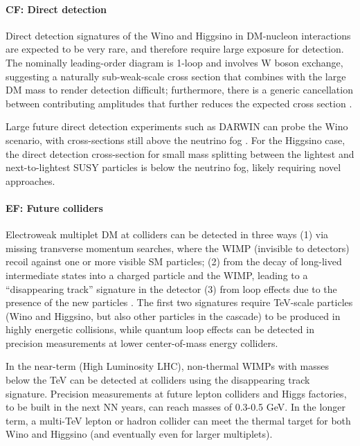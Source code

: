 \documentclass[nofootinbib]{article}
\begin{document}
\paragraph{CF: Direct detection} Direct detection signatures of the Wino and Higgsino in DM-nucleon interactions are expected to be very rare, and therefore require large exposure for detection. The nominally leading-order diagram is 1-loop and involves W boson exchange, suggesting a naturally sub-weak-scale cross section that combines with the large DM mass to render detection difficult; furthermore, there is a generic cancellation between contributing amplitudes that further reduces the expected cross section \cite{Chen:2019gtm}. 


Large future direct detection experiments such as DARWIN can probe the Wino scenario, with cross-sections still above the neutrino fog \cite{Chen:2018uqz}. 
For the Higgsino case, the direct detection cross-section for small mass splitting between the lightest and next-to-lightest SUSY particles is below the neutrino fog, likely requiring novel approaches. 

\paragraph{EF: Future colliders} Electroweak multiplet DM at colliders can be detected in three ways (1)  via missing transverse momentum searches, where the WIMP (invisible to detectors) recoil against one or more visible SM particles; (2) from the decay of long-lived intermediate states into a charged particle and the WIMP, leading to a “disappearing track” signature in the detector (3) from loop effects due to the presence of the new particles \cite{DiLuzio:2018jwd}. 
The first two signatures require TeV-scale particles (Wino and Higgsino, but also other particles in the cascade) to be produced in highly energetic collisions, while quantum loop effects can be detected in precision measurements at lower center-of-mass energy colliders.

In the near-term (High Luminosity LHC), non-thermal WIMPs with masses below the TeV can be detected at colliders using the disappearing track signature.
Precision measurements at future lepton colliders and Higgs factories, to be built in the next NN years, can reach masses of 0.3-0.5 GeV. 
In the longer term, a multi-TeV lepton or hadron collider can meet the thermal target for both Wino and Higgsino (and eventually even for larger multiplets). 
\end{document}

